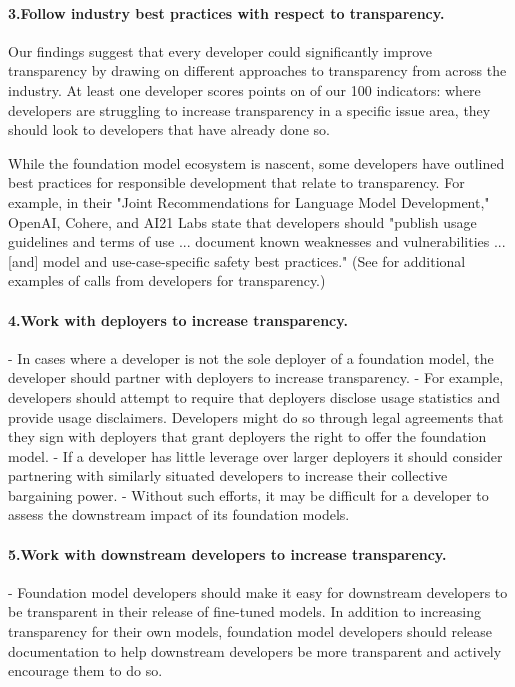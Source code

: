 \paragraph{3.\phantom{X}Follow industry best practices with respect to transparency.}
\begin{myitemize}
\item Our findings suggest that every developer could significantly improve transparency by drawing on different approaches to transparency from across the industry. 
At least one developer scores points on \numfeasible of our 100 indicators: where developers are struggling to increase transparency in a specific issue area, they should look to developers that have already done so.
\item While the foundation model ecosystem is nascent, some developers have outlined best practices for responsible development that relate to transparency. For example, in their "Joint Recommendations for Language Model Development," OpenAI, Cohere, and AI21 Labs state that developers should "publish usage guidelines and terms of use ... document known weaknesses and vulnerabilities ... [and] model and use-case-specific safety best practices." (See  for additional examples of calls from developers for transparency.)
\end{myitemize}
\paragraph{4.\phantom{X}Work with deployers to increase transparency.} 
-  In cases where a developer is not the sole deployer of a foundation model, the developer should partner with deployers to increase transparency.
- For example, developers should attempt to require that deployers disclose usage statistics and provide usage disclaimers. Developers might do so through legal agreements that they sign with deployers that grant deployers the right to offer the foundation model.
- If a developer has little leverage over larger deployers it should consider partnering with similarly situated developers to increase their collective bargaining power.
- Without such efforts, it may be difficult for a developer to assess the downstream impact of its foundation models.
\paragraph{5.\phantom{X}Work with downstream developers to increase transparency.} 
-  Foundation model developers should make it easy for downstream developers to be transparent in their release of fine-tuned models. In addition to increasing transparency for their own models, foundation model developers should release documentation to help downstream developers be more transparent and actively encourage them to do so.
